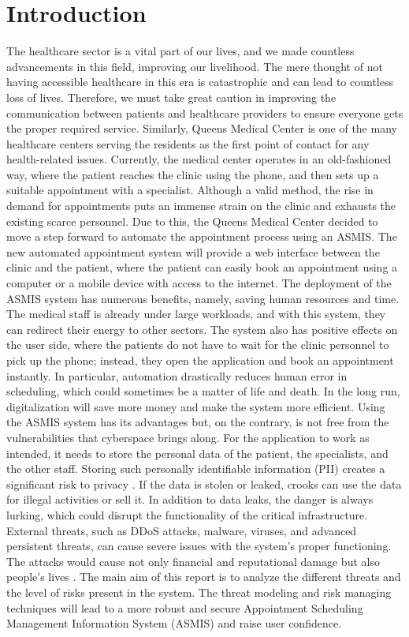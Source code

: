 \chapter{Introduction}
The healthcare sector is a vital part of our lives, and we made countless advancements in this field, improving our livelihood. The mere thought of not having accessible healthcare in this era is catastrophic and can lead to countless loss of lives. Therefore, we must take great caution in improving the communication between patients and healthcare providers to ensure everyone gets the proper required service.\newline \newline
Similarly, Queens Medical Center is one of the many healthcare centers serving the residents as the first point of contact for any health-related issues. Currently, the medical center operates in an old-fashioned way, where the patient reaches the clinic using the phone, and then sets up a suitable appointment with a specialist. Although a valid method, the rise in demand for appointments puts an immense strain on the clinic and exhausts the existing scarce personnel. Due to this, the Queens Medical Center decided to move a step forward to automate the appointment process using an ASMIS. The new automated appointment system will provide a web interface between the clinic and the patient, where the patient can easily book an appointment using a computer or a mobile device with access to the internet.\newline\newline
The deployment of the ASMIS system has numerous benefits, namely, saving human resources and time. The medical staff is already under large workloads, and with this system, they can redirect their energy to other sectors. The system also has positive effects on the user side, where the patients do not have to wait for the clinic personnel to pick up the phone; instead, they open the application and book an appointment instantly. In particular, automation drastically reduces human error in scheduling, which could sometimes be a matter of life and death. In the long run, digitalization will save more money and make the system more efficient.\newline\newline
Using the ASMIS system has its advantages but, on the contrary, is not free from the vulnerabilities that cyberspace brings along. For the application to work as intended, it needs to store the personal data of the patient, the specialists, and the other staff. Storing such personally identifiable information (PII) creates a significant risk to privacy \citep[p.~374]{IOT}. If the data is stolen or leaked, crooks can use the data for illegal activities or sell it. In addition to data leaks, the danger is always lurking, which could disrupt the functionality of the critical infrastructure. External threats, such as DDoS attacks, malware, viruses, and advanced persistent threats, can cause severe issues with the system's proper functioning. The attacks would cause not only financial and reputational damage but also people’s lives \citep[p.~377]{IOT}.\newline\newline
The main aim of this report is to analyze the different threats and the level of risks present in the system. The threat modeling and risk managing techniques will lead to a more robust and secure Appointment Scheduling Management Information System (ASMIS) and raise user confidence.
